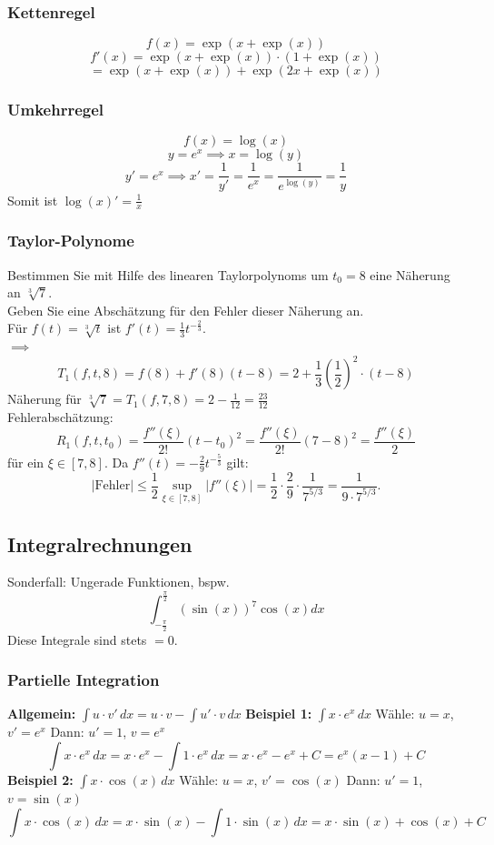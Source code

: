 \documentclass[a4paper,fontsize = 7pt]{scrartcl}
\begin{document}
\subsubsection{Kettenregel}
    \[f(x) = \exp(x+\exp(x))\]
    \[f'(x) = \exp(x+\exp(x))\cdot(1+\exp(x))\]
    \[= \exp(x+\exp(x))+\exp(2x+\exp(x))\]
\subsubsection{Umkehrregel}
    \[f(x)=\log(x)\]
    \[y=e^x\implies x=\log(y)\]
    \[y'=e^x\implies x'=\frac{1}{y'}=\frac{1}{e^x}=\frac{1}{e^{\log(y)}}=\frac{1}{y}\]
    Somit ist $\log(x)'=\frac{1}{x}$
\subsubsection{Taylor-Polynome}
    Bestimmen Sie mit Hilfe des linearen Taylorpolynoms um $t_0 = 8$ eine Näherung
    an $\sqrt[3]{7}$.
    \\Geben Sie eine Abschätzung für den Fehler dieser Näherung an.
    \\Für $f(t) = \sqrt[3]{t}$ ist $f'(t) = \frac{1}{3}t^{-\frac{2}{3}}$.
    \\$\implies$
    $$T_1(f, t, 8) = f(8) + f'(8)(t - 8) = 2 + \frac{1}{3}\left(\frac{1}{2}\right)^2 \cdot (t- 8)$$
    Näherung für $\sqrt[3]{7} = T_1(f, 7, 8) = 2 - \frac{1}{12} = \frac{23}{12}$
    \\Fehlerabschätzung:
    $$R_1(f, t, t_0) = \frac{f''(\xi)}{2!}(t - t_0)^2 = \frac{f''(\xi)}{2!}(7-8)^2 = \frac{f''(\xi)}{2}$$
    für ein $\xi \in [7, 8]$.
    Da $f''(t) =-\frac{2}{9} t^{-\frac{5}{3}}$ gilt:
    $$|\text{Fehler}| \leq \frac{1}{2} \sup_{\xi \in [7, 8]} |f''(\xi)| = \frac{1}{2}\cdot \frac{2}{9} \cdot \frac{1}{7^{5/3}} = \frac{1}{9 \cdot 7^{5/3}}.$$

\subsection{Integralrechnungen}
    Sonderfall: Ungerade Funktionen, bspw.
    \[\int_{-\frac{\pi}{2}}^{\frac{\pi}{2}}(\sin(x))^7 \cos(x)dx\]
    Diese Integrale sind stets $=0$.
\subsubsection{Partielle Integration}
	\textbf{Allgemein:} $\int u \cdot v' \, dx = u \cdot v - \int u' \cdot v \, dx$
	\textbf{Beispiel 1:} $\int x \cdot e^x \, dx$
	Wähle: $u = x$, $v' = e^x$
	Dann: $u' = 1$, $v = e^x$
	$$\int x \cdot e^x \, dx = x \cdot e^x - \int 1 \cdot e^x \, dx = x \cdot e^x - e^x + C = e^x(x-1) + C$$
	\textbf{Beispiel 2:} $\int x \cdot \cos(x) \, dx$
	Wähle: $u = x$, $v' = \cos(x)$
	Dann: $u' = 1$, $v = \sin(x)$
	$$\int x \cdot \cos(x) \, dx = x \cdot \sin(x) - \int 1 \cdot \sin(x) \, dx = x \cdot \sin(x) + \cos(x) + C$$
\end{document}
